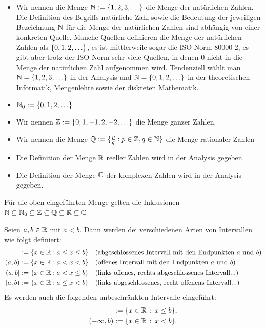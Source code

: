 \begin{itemize}
	\item Wir nennen die Menge $\mathbb N := \{ 1,2,3,\ldots \} $ die Menge der natürlichen Zahlen. Die Definition des Begriffs natürliche Zahl sowie die Bedeutung der jeweiligen Bezeichnung $\mathbb N$ für die Menge der natürlichen Zahlen sind abhängig von einer konkreten Quelle. Manche Quellen definieren die Menge der natürlichen Zahlen als $ \left\{ 0,1,2,\ldots \right\} $, es ist mittlerweile sogar die ISO-Norm 80000-2, es gibt aber trotz der ISO-Norm sehr viele Quellen, in denen $0$ nicht in die Menge der natürlichen Zahl aufgenommen wird. Tendenziell wählt man  $\mathbb N = \{1,2,3,\ldots \}$ in der Analysis und $\mathbb N = \{0,1,2,\ldots\}$ in der theoretischen Informatik, Mengenlehre sowie der diskreten Mathematik.
	\item $ \mathbb N_0 := \{ 0,1,2,\ldots \} $
	\item Wir nennen $ \mathbb Z  := \{ 0,1,-1,2,-2,\ldots \} $ die Menge ganzer Zahlen. 
	\item Wir nennen die Menge $ \mathbb Q  := \{ \frac{p}{q} : p \in \mathbb Z, q \in \mathbb N \}$ die Menge rationaler Zahlen
	\item Die Definition der Menge $ \mathbb R $ reeller Zahlen wird in der Analysis gegeben. 
	\item Die Definition der Menge $\mathbb C$ der komplexen Zahlen wird in der Analysis gegeben. 
\end{itemize}

\noindent Für die oben eingeführten Menge gelten die Inklusionen $ \mathbb N \subseteq \mathbb N_0 \subseteq \mathbb Z \subseteq \mathbb Q \subseteq \mathbb R \subseteq \mathbb C $

\begin{bem}[Intervalle]
	Seien $ a,b \in \mathbb R $ mit $ a < b $. Dann werden dei verschiedenen Arten von  Intervallen wie folgt definiert:
	\begin{align*}
		[a,b] &:= \{ x \in \R : a \leq x \leq b \} & & \text{(abgeschlossenes Intervall mit den Endpunkten $a$ und $b$)}\\ 
		(a,b) &:= \{ x \in \R : a < x < b \}  &  &\text{(offenes Intervall mit den Endpunkten $a$ und $b$)}\\
		(a,b] &:= \{ x \in \R : a < x \leq b \} & & \text{(links offenes, rechts abgeschlossenes Intervall...)} \\ 
		[a,b) &:= \{ x \in \R : a \leq x < b \} & & \text{(links abgeschlossenes, recht offenens Intervall...)} 
	\end{align*}
	Es werden auch die folgenden unbeschränkten Intervalle eingeführt:
	\begin{align*}
	 [a,\infty) & := \{ x \in \R \,:\, x \ge a\},
	 \\  (a,\infty) &:= \{ x \in \R \,:\, x > a\},
	 \\ (-\infty,b] &:= \{ x\in \R\,:\, x \le b\},
	\\  (-\infty,b) &:= \{ x \in \R\,:\, x < b\}. 
	\end{align*} 
\end{bem}


